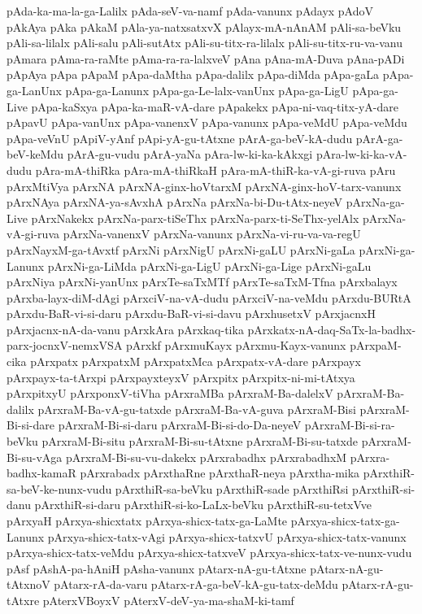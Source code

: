 {pAda-ka-ma-la-ga-Lalilx
pAda-seV-va-namf
pAda-vanunx
pAdayx
pAdoV
pAkAya
pAka
pAkaM
pAla-ya-natxsatxvX
pAlayx-mA-nAnAM
pAli-sa-beVku
pAli-sa-lilalx
pAli-salu
pAli-sutAtx
pAli-su-titx-ra-lilalx
pAli-su-titx-ru-va-vanu
pAmara
pAma-ra-raMte
pAma-ra-ra-lalxveV
pAna
pAna-mA-Duva
pAna-pADi
pApAya
pApa
pApaM
pApa-daMtha
pApa-dalilx
pApa-diMda
pApa-gaLa
pApa-ga-LanUnx
pApa-ga-Lanunx
pApa-ga-Le-lalx-vanUnx
pApa-ga-LigU
pApa-ga-Live
pApa-kaSxya
pApa-ka-maR-vA-dare
pApakekx
pApa-ni-vaq-titx-yA-dare
pApavU
pApa-vanUnx
pApa-vanenxV
pApa-vanunx
pApa-veMdU
pApa-veMdu
pApa-veVnU
pApiV-yAnf
pApi-yA-gu-tAtxne
pArA-ga-beV-kA-dudu
pArA-ga-beV-keMdu
pArA-gu-vudu
pArA-yaNa
pAra-lw-ki-ka-kAkxgi
pAra-lw-ki-ka-vA-dudu
pAra-mA-thiRka
pAra-mA-thiRkaH
pAra-mA-thiR-ka-vA-gi-ruva
pAru
pArxMtiVya
pArxNA
pArxNA-ginx-hoVtarxM
pArxNA-ginx-hoV-tarx-vanunx
pArxNAya
pArxNA-ya-sAvxhA
pArxNa
pArxNa-bi-Du-tAtx-neyeV
pArxNa-ga-Live
pArxNakekx
pArxNa-parx-tiSeThx
pArxNa-parx-ti-SeThx-yelAlx
pArxNa-vA-gi-ruva
pArxNa-vanenxV
pArxNa-vanunx
pArxNa-vi-ru-va-va-regU
pArxNayxM-ga-tAvxtf
pArxNi
pArxNigU
pArxNi-gaLU
pArxNi-gaLa
pArxNi-ga-Lanunx
pArxNi-ga-LiMda
pArxNi-ga-LigU
pArxNi-ga-Lige
pArxNi-gaLu
pArxNiya
pArxNi-yanUnx
pArxTe-saTxMTf
pArxTe-saTxM-Tfna
pArxbalayx
pArxba-layx-diM-dAgi
pArxciV-na-vA-dudu
pArxciV-na-veMdu
pArxdu-BURtA
pArxdu-BaR-vi-si-daru
pArxdu-BaR-vi-si-davu
pArxhusetxV
pArxjacnxH
pArxjacnx-nA-da-vanu
pArxkAra
pArxkaq-tika
pArxkatx-nA-daq-SaTx-la-badhx-parx-jocnxV-nemxVSA
pArxkf
pArxmuKayx
pArxmu-Kayx-vanunx
pArxpaM-cika
pArxpatx
pArxpatxM
pArxpatxMca
pArxpatx-vA-dare
pArxpayx
pArxpayx-ta-tArxpi
pArxpayxteyxV
pArxpitx
pArxpitx-ni-mi-tAtxya
pArxpitxyU
pArxponxV-tiVha
pArxraMBa
pArxraM-Ba-dalelxV
pArxraM-Ba-dalilx
pArxraM-Ba-vA-gu-tatxde
pArxraM-Ba-vA-guva
pArxraM-Bisi
pArxraM-Bi-si-dare
pArxraM-Bi-si-daru
pArxraM-Bi-si-do-Da-neyeV
pArxraM-Bi-si-ra-beVku
pArxraM-Bi-situ
pArxraM-Bi-su-tAtxne
pArxraM-Bi-su-tatxde
pArxraM-Bi-su-vAga
pArxraM-Bi-su-vu-dakekx
pArxrabadhx
pArxrabadhxM
pArxra-badhx-kamaR
pArxrabadx
pArxthaRne
pArxthaR-neya
pArxtha-mika
pArxthiR-sa-beV-ke-nunx-vudu
pArxthiR-sa-beVku
pArxthiR-sade
pArxthiRsi
pArxthiR-si-danu
pArxthiR-si-daru
pArxthiR-si-ko-LaLx-beVku
pArxthiR-su-tetxVve
pArxyaH
pArxya-shicxtatx
pArxya-shicx-tatx-ga-LaMte
pArxya-shicx-tatx-ga-Lanunx
pArxya-shicx-tatx-vAgi
pArxya-shicx-tatxvU
pArxya-shicx-tatx-vanunx
pArxya-shicx-tatx-veMdu
pArxya-shicx-tatxveV
pArxya-shicx-tatx-ve-nunx-vudu
pAsf
pAshA-pa-hAniH
pAsha-vanunx
pAtarx-nA-gu-tAtxne
pAtarx-nA-gu-tAtxnoV
pAtarx-rA-da-varu
pAtarx-rA-ga-beV-kA-gu-tatx-deMdu
pAtarx-rA-gu-tAtxre
pAterxVBoyxV
pAterxV-deV-ya-ma-shaM-ki-tamf
}

